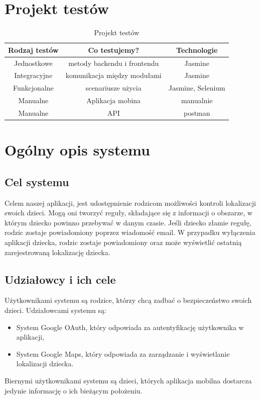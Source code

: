 \documentclass{sprawozdanie-agh}
\begin{document}
	\section{Projekt testów}
	
	\begin{table}[h]
		\centering
		\begin{tabular}{|c|c|c|}
			\hline
			\textbf{Rodzaj testów} & \textbf{Co testujemy?} & \textbf{Technologie} \\
			\hline
			Jednostkowe & metody backendu i frontendu & Jasmine \\ \hline
			Integracyjne & komunikacja między modułami & Jasmine \\ \hline
			Funkcjonalne & scenariusze użycia & Jasmine, Selenium \\ \hline
			Manualne & Aplikacja mobina & manualnie \\ \hline
			Manualne & API & postman \\ \hline
		\end{tabular}
		\caption{Projekt testów}
	\end{table}




	\section{Ogólny opis systemu}

		\subsection{Cel systemu}

			Celem naszej aplikacji, jest udostępnienie rodzicom możliwości kontroli lokalizacji swoich dzieci. Mogą oni tworzyć reguły, składające się z informacji o obszarze, w którym dziecko powinno przebywać w danym czasie. Jeśli dziecko złamie regułę, rodzic zostaje powiadomiony poprzez wiadomość email. W przypadku wyłączenia aplikacji dziecka, rodzic zostaje powiadomiony oraz może wyświetlić ostatnią zarejestrowaną lokalizację dziecka.

		\subsection{Udziałowcy i ich cele}

			Użytkownikami systemu są rodzice, którzy chcą zadbać o bezpieczeństwo swoich dzieci. Udziałowcami systemu są:

			\begin{itemize}
				\item System Google OAuth, który odpowiada za autentyfikację użytkownika w aplikacji,
				\item System Google Maps, który odpowiada za zarządzanie i wyświetlanie lokalizacji dziecka.
			\end{itemize}
			Biernymi użytkownikami systemu są dzieci, których aplikacja mobilna dostarcza jedynie informację o ich bieżącym położeniu.
\end{document}
